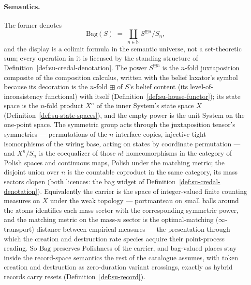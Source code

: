 \paragraph{Semantics.} The former denotes
\[
\mathrm{Bag}(S) \;=\; \coprod_{n \in \mathbb{N}} S^{\boxplus n} / S_n,
\]
and the display is a colimit formula in the semantic universe, not a
set-theoretic sum; every operation in it is licensed by the standing
structure of Definition~\ref{def:su-credal-denotation}. The power
$S^{\boxplus n}$ is the $n$-fold juxtaposition composite of the
composition calculus, written with the belief laxator's symbol
because its decoration is the $n$-fold $\boxplus$ of $S$'s belief
content (its level-of-inconsistency functional) with itself
(Definition~\ref{def:su-house-functor}); its
state space is the $n$-fold product $X^n$ of the inner System's
state space $X$ (Definition~\ref{def:su-state-spaces}), and the
empty power is the unit System on the one-point space. The symmetric
group acts through the juxtaposition tensor's symmetries ---
permutations of the $n$ interface copies, injective tight
isomorphisms of the wiring base, acting on states by coordinate
permutation --- and $X^n/S_n$ is the coequalizer of those $n!$
homeomorphisms in the category of Polish spaces and continuous maps,
Polish under the matching metric; the disjoint union over $n$ is
the countable coproduct in the same category, its mass sectors clopen
(both licences: the bag widget of
Definition~\ref{def:su-credal-denotation}). Equivalently the carrier
is the space of integer-valued finite counting measures on $X$ under
the weak topology --- portmanteau on small balls around the atoms
identifies each mass sector with the corresponding symmetric power,
and the matching metric on the mass-$n$ sector is the
optimal-matching ($\infty$-transport) distance between empirical
measures --- the presentation through which the creation and
destruction rate species acquire their point-process reading. So
$\mathrm{Bag}$ preserves Polishness of the carrier, and bag-valued
places stay inside the record-space semantics the rest of the
catalogue assumes, with token creation and destruction as
zero-duration variant crossings, exactly as hybrid records carry
resets (Definition~\ref{def:su-record}).

